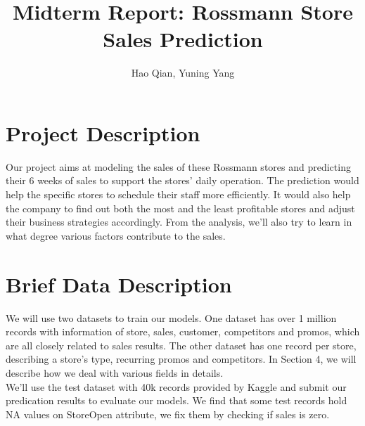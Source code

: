 \documentclass[11pt]{article}
\title{Midterm Report: Rossmann Store Sales Prediction}
\date{\vspace{-5ex}}
\author{Hao Qian, Yuning Yang}
\begin{document}
\maketitle
\section{Project Description}
Our project aims at modeling the sales of these Rossmann stores and predicting their 6 weeks of sales to support the stores’ daily operation. The prediction would help the specific stores to schedule their staff more efficiently. It would also help the company to find out both the most and the least profitable stores and adjust their business strategies accordingly. From the analysis, we'll also try to learn in what degree various factors contribute to the sales. 

\section{Brief Data Description}
We will use two datasets to train our models. One dataset has over 1 million records with information of store, sales, customer, competitors and promos, which are all closely related to sales results. The other dataset has one record per store, describing a store's type, recurring promos and competitors. In Section 4, we will describe how we deal with various fields in details.\\
We'll use the test dataset with 40k records provided by Kaggle and submit our predication results to evaluate our models. We find that some test records hold NA values on StoreOpen attribute, we fix them by checking if sales is zero.
\end{document}
